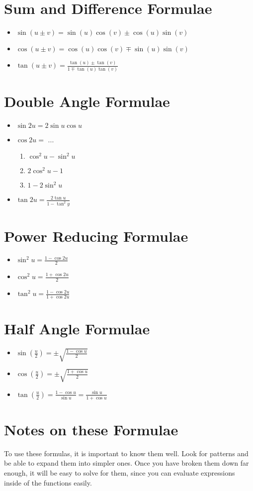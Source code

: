 \section{Sum and Difference Formulae}
\begin{itemize}
  \item{$\sin(u \pm v)=\sin(u)\cos(v) \pm \cos(u)\sin(v)$}
  \item{$\cos(u \pm v)=\cos(u)\cos(v) \mp \sin(u)\sin(v)$}
  \item{$\tan(u \pm v)=\frac{\tan(u) \pm \tan(v)}{1 \mp \tan(u)\tan(v)}$}
\end{itemize}

\section{Double Angle Formulae}
\begin{itemize}
  \item{$\sin2u=2\sin u\cos u$}
  \item{$\cos2u=$ ...}
    \begin{enumerate}
      \item{$\cos^2u-\sin^2u$}
      \item{$2\cos^2u-1$}
      \item{$1-2\sin^2u$}
    \end{enumerate}
  \item{$\tan2u=\frac{2\tan u}{1-\tan^2y}$}
\end{itemize}

\section{Power Reducing Formulae}
\begin{itemize}
  \item{$\sin^2u=\frac{1-\cos 2u}{2}$}
  \item{$\cos^2u=\frac{1+\cos 2u}{2}$}
  \item{$\tan^2u=\frac{1-\cos 2u}{1+\cos 2u}$}
\end{itemize}

\section{Half Angle Formulae}
\begin{itemize}
  \item{$\sin(\frac{u}{2})=\pm\sqrt{\frac{1-\cos u}{2}}$}
  \item{$\cos(\frac{u}{2})=\pm\sqrt{\frac{1+\cos u}{2}}$}
  \item{$\tan(\frac{u}{2})=\frac{1-\cos u}{\sin u}=\frac{\sin u}{1+\cos u}$}
\end{itemize}

\section{Notes on these Formulae}
To use these formulas, it is important to know them well.  Look for patterns and
be able to expand them into simpler ones.  Once you have broken them down far
enough, it will be easy to solve for them, since you can evaluate expressions
inside of the functions easily.
